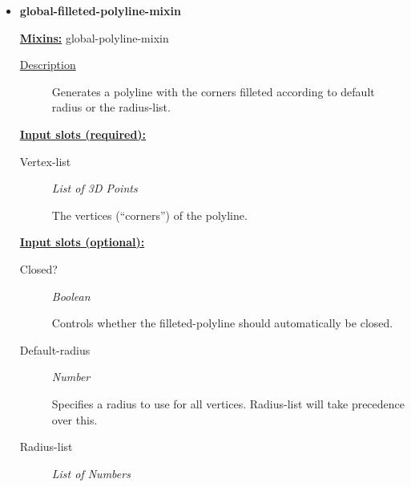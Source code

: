\documentclass [11pt]{book}
\begin{document}
\begin{itemize}
\item {}
\label{prim:global-filleted-polyline-mixin}
\textbf{global-filleted-polyline-mixin}


\textbf{
\underline{Mixins:}} global-polyline-mixin





\begin{description}

\item [
\underline{Description}]


Generates a polyline with the corners filleted according to default radius or the radius-list.



\end{description}








\textbf{
\underline{Input slots (required):}}

\begin{description}

\item [Vertex-list]
\emph{List of 3D Points}

 The vertices (``corners'') of the polyline.




\end{description}






\textbf{
\underline{Input slots (optional):}}

\begin{description}

\item [Closed?]
\emph{Boolean}

 Controls whether the filleted-polyline should automatically be closed.




\item [Default-radius]
\emph{Number}

 Specifies a radius to use for all vertices. Radius-list will take precedence over this.




\item [Radius-list]
\emph{List of Numbers}


\end{description}
\end{itemize}
\end{document}
